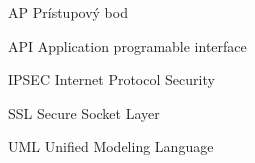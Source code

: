 \begin{seznamzkratek}{90}
	
		{AP}								%
		{Prístupový bod}	
	
		{API}								%
		{Application programable interface}
	
		{IPSEC}								%
		{Internet Protocol Security}
		
		{SSL}								%
		{Secure Socket Layer}
		
		{UML}								%
		{Unified Modeling Language}

												
\end{seznamzkratek}

